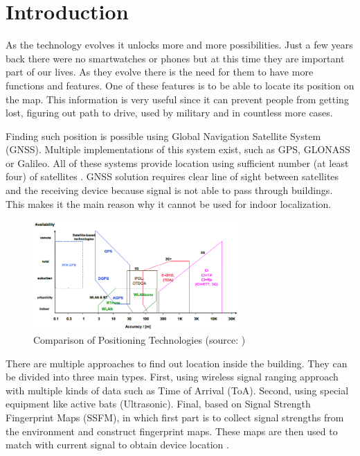 \chapter{Introduction}\label{sec:Introduction}
\setcounter{page}{1}
As the technology evolves it unlocks more and more possibilities. Just a few years back there were no smartwatches or phones but at this time they are important part of our lives. As they evolve there is the need for them to have more functions and features. One of these features is to be able to locate its position on the map. This information is very useful since it can prevent people from getting lost, figuring out path to drive, used by military and in countless more cases.

Finding such position is possible using Global Navigation Satellite System (GNSS). Multiple implementations of this system exist, such as GPS, GLONASS or Galileo. All of these systems provide location using sufficient number (at least four) of satellites \cite{GNSS, GNSSGPS}. GNSS solution requires clear line of sight between satellites and the receiving device because signal is not able to pass through buildings. This makes it the main reason why it cannot be used for indoor localization.

\begin{figure}[h!]
	\begin{centering}
		\includegraphics[width=0.7\textwidth]{img/1_comparison_of_positionin_technologies}
		\par\end{centering}
	\caption{Comparison of Positioning Technologies (source: \cite{PedestrianDeadReckoning})\label{fig:1_comparison_of_positionin_technologies}}
	\label{fig01c01}
\end{figure}

There are multiple approaches to find out location inside the building. They can be divided into three main types. First, using wireless signal ranging approach with multiple kinds of data such as Time of Arrival (ToA). Second, using special equipment like active bats (Ultrasonic). Final, based on Signal Strength Fingerprint Maps (SSFM), in which first part is to collect signal strengths from the environment and construct fingerprint maps. These maps are then used to match with current signal to obtain device location \cite{LocalizationApproaches}.

